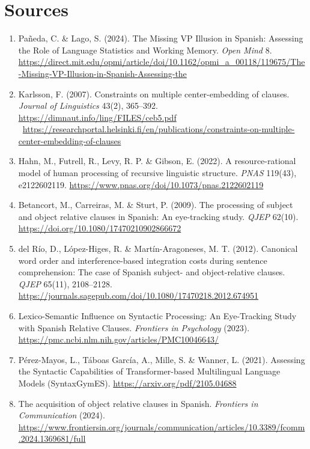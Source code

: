 \documentclass[11pt, a4paper]{article}
\begin{document}
\section*{Sources}

\begin{enumerate}[leftmargin=1.6em, itemsep=0.6em, label={}]
\small\RaggedRight
\item Pañeda, C. \& Lago, S. (2024). The Missing VP Illusion in Spanish: Assessing the Role of Language Statistics and Working Memory. \emph{Open Mind} 8. \url{https://direct.mit.edu/opmi/article/doi/10.1162/opmi_a_00118/119675/The-Missing-VP-Illusion-in-Spanish-Assessing-the}
\item Karlsson, F. (2007). Constraints on multiple center-embedding of clauses. \emph{Journal of Linguistics} 43(2), 365--392. \url{https://dimnaut.info/ling/FILES/ceb5.pdf} \textperiodcentered\ \url{https://researchportal.helsinki.fi/en/publications/constraints-on-multiple-center-embedding-of-clauses}
\item Hahn, M., Futrell, R., Levy, R. P. \& Gibson, E. (2022). A resource-rational model of human processing of recursive linguistic structure. \emph{PNAS} 119(43), e2122602119. \url{https://www.pnas.org/doi/10.1073/pnas.2122602119}
\item Betancort, M., Carreiras, M. \& Sturt, P. (2009). The processing of subject and object relative clauses in Spanish: An eye-tracking study. \emph{QJEP} 62(10). \url{https://doi.org/10.1080/17470210902866672}
\item del Río, D., López-Higes, R. \& Martín-Aragoneses, M. T. (2012). Canonical word order and interference-based integration costs during sentence comprehension: The case of Spanish subject- and object-relative clauses. \emph{QJEP} 65(11), 2108--2128. \url{https://journals.sagepub.com/doi/10.1080/17470218.2012.674951}
\item Lexico-Semantic Influence on Syntactic Processing: An Eye-Tracking Study with Spanish Relative Clauses. \emph{Frontiers in Psychology} (2023). \url{https://pmc.ncbi.nlm.nih.gov/articles/PMC10046643/}
\item Pérez-Mayos, L., Táboas García, A., Mille, S. \& Wanner, L. (2021). Assessing the Syntactic Capabilities of Transformer-based Multilingual Language Models (SyntaxGymES). \url{https://arxiv.org/pdf/2105.04688}
\item The acquisition of object relative clauses in Spanish. \emph{Frontiers in Communication} (2024). \url{https://www.frontiersin.org/journals/communication/articles/10.3389/fcomm.2024.1369681/full}

\end{enumerate}
\end{document}
